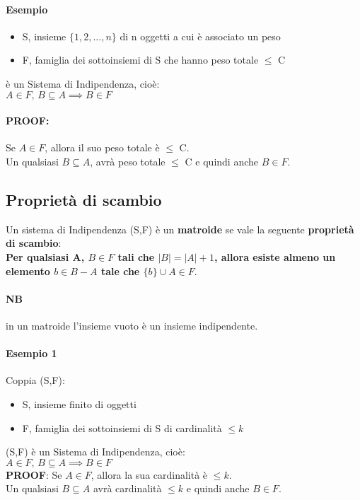 \paragraph*{Esempio}
\begin{itemize}
    \item S, insieme $\{1,2,...,n\}$ di n oggetti a cui è associato un peso
    \item F, famiglia dei sottoinsiemi di S che hanno peso totale $\leq$ C
\end{itemize}
è un Sistema di Indipendenza, cioè:\\
$A \in F, \, B \subseteq A \implies B \in F$\\
\paragraph*{PROOF:} Se $A \in F$, allora il suo peso totale è $\leq$ C.\\
Un qualsiasi $B \subseteq A$, avrà peso totale $\leq$ C e quindi anche $B \in F$.\\
\subsection{Proprietà di scambio}
Un sistema di Indipendenza (S,F) è un \textbf{matroide} se vale la seguente
\textbf{proprietà di scambio}:\\
\textbf{Per qualsiasi A, $B \in F$ tali che $|B|=|A|+1$, allora esiste almeno un elemento
$b \in B-A$ tale che $\{b\}\cup A \in F $}.\\
\paragraph*{NB} in un matroide l'insieme vuoto è un insieme indipendente.
\paragraph*{Esempio 1} Coppia (S,F):
\begin{itemize}
    \item S, insieme finito di oggetti
    \item F, famiglia dei sottoinsiemi di S di cardinalità $\leq k$
\end{itemize}
(S,F) è un Sistema di Indipendenza, cioè:\\
$A \in F, \, B \subseteq A \implies B \in F$\\
\textbf{PROOF}: Se $A \in F$, allora la sua cardinalità è $\leq k$.\\
Un qualsiasi $B \subseteq A$ avrà cardinalità $\leq k$ e quindi anche $B \in F$.
